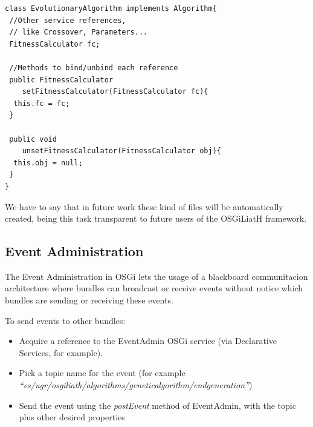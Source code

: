 \documentclass{sig-alternate}
\begin{document}
\begin{lstlisting}
class EvolutionaryAlgorithm implements Algorithm{
 //Other service references,
 // like Crossover, Parameters...
 FitnessCalculator fc;
 
 //Methods to bind/unbind each reference
 public FitnessCalculator 
    setFitnessCalculator(FitnessCalculator fc){
  this.fc = fc;
 }
	
 public void 
    unsetFitnessCalculator(FitnessCalculator obj){
  this.obj = null;
 }
}
\end{lstlisting}

We have to say that in future work these kind of files will be automatically created, being this task transparent to future users of the OSGiLiatH framework.

\subsection{Event Administration}
The Event Administration in OSGi lets the usage of a blackboard communitacion architecture where bundles can broadcast or receive events without notice which bundles are sending or receiving these events.


To send events to other bundles:
\begin{itemize}
\item Acquire a reference to the EventAdmin OSGi service (via Declarative Services, for example).
\item Pick a topic name for the event (for example {\em ``es/ugr/osgiliath/algorithms/geneticalgorithm/endgeneration''})
\item Send the event using the {\em postEvent} method of EventAdmin, with the topic plus other desired properties %
\end{itemize}
\end{document}
